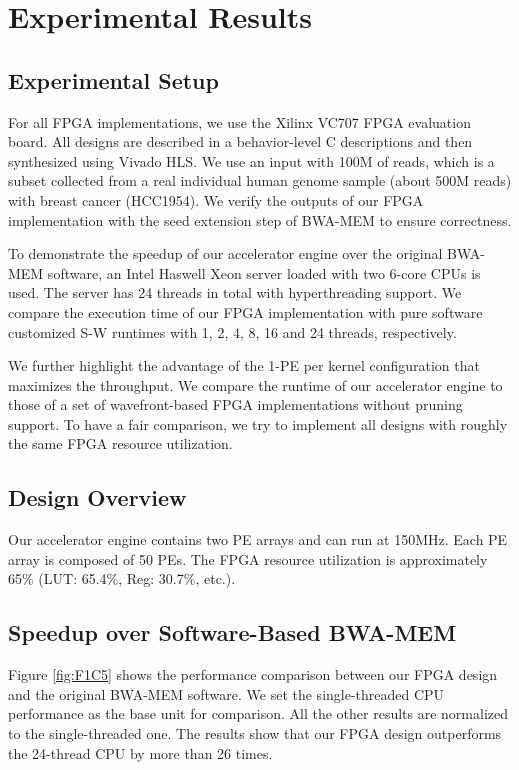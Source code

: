 \section{Experimental Results} 
\label{sec:results}
\subsection{Experimental Setup}

For all FPGA implementations, we use the Xilinx VC707 FPGA evaluation board.
All designs are described in a behavior-level C descriptions and then synthesized using Vivado HLS.
We use an input with 100M of reads, which is a subset collected from a real individual human genome sample (about 500M reads) with breast cancer (HCC1954). 
We verify the outputs of our FPGA implementation with the seed extension step of BWA-MEM to ensure correctness. 

To demonstrate the speedup of our accelerator engine over the original BWA-MEM software, 
an Intel Haswell Xeon server loaded with two 6-core CPUs is used.
The server has 24 threads in total with hyperthreading support.
We compare the execution time of our FPGA implementation with pure software customized S-W runtimes with 1, 2, 4, 8, 16 and 24 threads, respectively.

We further highlight the advantage of the 1-PE per kernel configuration that maximizes the throughput.
We compare the runtime of our accelerator engine to those of a set of wavefront-based FPGA implementations without pruning support.
To have a fair comparison, we try to implement all designs with roughly the same FPGA resource utilization.

\subsection{Design Overview}

Our accelerator engine contains two PE arrays and can run at 150MHz.
Each PE array is composed of 50 PEs.
The FPGA resource utilization is approximately 65\% (LUT: 65.4\%, Reg: 30.7\%, etc.). 

\subsection{Speedup over Software-Based BWA-MEM}

Figure \ref{fig:F1C5} shows the performance comparison between our FPGA design and the original BWA-MEM software.
We set the single-threaded CPU performance as the base unit for comparison. All the other results are normalized to the single-threaded one.
The results show that our FPGA design outperforms the 24-thread CPU by more than 26 times.

